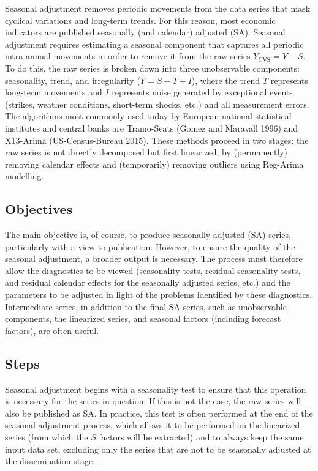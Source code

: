 \documentclass[
  letterpaper,
  DIV=11,
  numbers=noendperiod]{scrreprt}
\begin{document}
Seasonal adjustment removes periodic movements from the data series that
mask cyclical variations and long-term trends. For this reason, most
economic indicators are published seasonally (and calendar) adjusted
(SA). Seasonal adjustment requires estimating a seasonal component that
captures all periodic intra-annual movements in order to remove it from
the raw series \(Y_\text{CVS} = Y-S\). To do this, the raw series is
broken down into three unobservable components: seasonality, trend, and
irregularity (\(Y=S+T+I\)), where the trend \(T\) represents long-term
movements and \(I\) represents noise generated by exceptional events
(strikes, weather conditions, short-term shocks, etc.) and all
measurement errors. The algorithms most commonly used today by European
national statistical institutes and central banks are Tramo-Seats (Gomez
and Maravall 1996) and X13-Arima (US-Census-Bureau 2015). These methods
proceed in two stages: the raw series is not directly decomposed but
first linearized, by (permanently) removing calendar effects and
(temporarily) removing outliers using Reg-Arima modelling.

\hypertarget{objectives}{%
\subsection*{Objectives}\label{objectives}}

The main objective is, of course, to produce seasonally adjusted (SA)
series, particularly with a view to publication. However, to ensure the
quality of the seasonal adjustment, a broader output is necessary. The
process must therefore allow the diagnostics to be viewed (seasonality
tests, residual seasonality tests, and residual calendar effects for the
seasonally adjusted series, etc.) and the parameters to be adjusted in
light of the problems identified by these diagnostics. Intermediate
series, in addition to the final SA series, such as unobservable
components, the linearized series, and seasonal factors (including
forecast factors), are often useful.

\hypertarget{steps}{%
\subsection*{Steps}\label{steps}}

Seasonal adjustment begins with a seasonality test to ensure that this
operation is necessary for the series in question. If this is not the
case, the raw series will also be published as SA. In practice, this
test is often performed at the end of the seasonal adjustment process,
which allows it to be performed on the linearized series (from which the
\(S\) factors will be extracted) and to always keep the same input data
set, excluding only the series that are not to be seasonally adjusted at
the dissemination stage.
\end{document}
